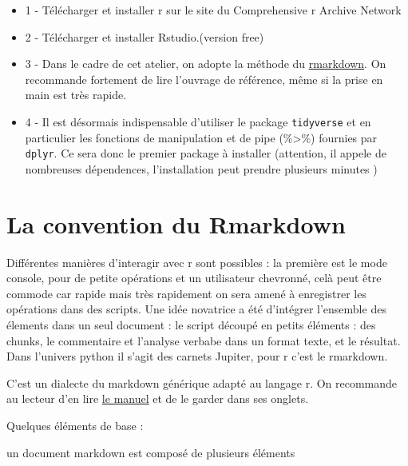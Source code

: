 \documentclass[
]{book}
\providecommand{\tightlist}{%
  \setlength{\itemsep}{0pt}\setlength{\parskip}{0pt}}
\begin{document}
\begin{itemize}
\tightlist
\item
  1 - Télécharger et installer r sur le site du Comprehensive r Archive Network
\item
  2 - Télécharger et installer Rstudio.(version free)
\item
  3 - Dans le cadre de cet atelier, on adopte la méthode du \href{https://rmarkdown.rstudio.com/lesson-1.html}{rmarkdown}. On recommande fortement de lire l'ouvrage de référence, même si la prise en main est très rapide.
\item
  4 - Il est désormais indispensable d'utiliser le package \texttt{tidyverse} et en particulier les fonctions de manipulation et de pipe (\%\textgreater\%) fournies par \texttt{dplyr}. Ce sera donc le premier package à installer (attention, il appele de nombreuses dépendences, l'installation peut prendre plusieurs minutes )
\end{itemize}

\hypertarget{la-convention-du-rmarkdown}{%
\section{La convention du Rmarkdown}\label{la-convention-du-rmarkdown}}

Différentes manières d'interagir avec r sont possibles : la première est le mode console, pour de petite opérations et un utilisateur chevronné, celà peut être commode car rapide mais très rapidement on sera amené à enregistrer les opérations dans des scripts. Une idée novatrice a été d'intégrer l'ensemble des élements dans un seul document : le script découpé en petits éléments : des chunks, le commentaire et l'analyse verbabe dans un format texte, et le résultat. Dans l'univers python il s'agit des carnets Jupiter, pour r c'est le rmarkdown.

C'est un dialecte du markdown générique adapté au langage r. On recommande au lecteur d'en lire \href{https://bookdown.org/yihui/rmarkdown/}{le manuel} et de le garder dans ses onglets.

Quelques éléments de base :

un document markdown est composé de plusieurs éléments
\end{document}
